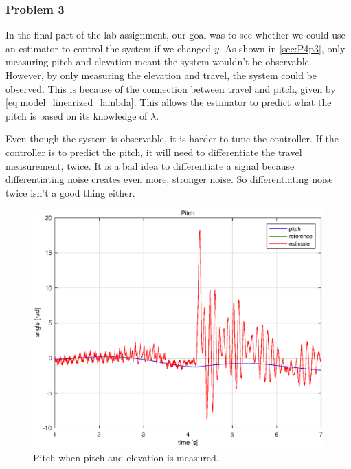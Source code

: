 

\subsubsection{Problem 3}


In the final part of the lab assignment, our goal was to see whether we could use an estimator to control the system if we changed $y$. As shown in \cref{sec:P4p3}, only measuring pitch and elevation meant the system wouldn't be observable. However, by only measuring the elevation and travel, the system could be observed. This is because of the connection between travel and pitch, given by \cref{eq:model_linearized_lambda}. This allows the estimator to predict what the pitch is based on its knowledge of $\lambda$. \medskip

Even though the system is observable, it is harder to tune the controller. If the controller is to predict the pitch, it will need to differentiate the travel measurement, twice. It is a bad idea to differentiate a signal because differentiating noise creates even more, stronger noise. So differentiating noise twice isn't a good thing either.\medskip

\begin{figure}[H]
    \centering
	\includegraphics[width=0.9\linewidth]{plots/part4new/pitch_bad.eps}
    \caption{Pitch when pitch and elevation is measured.}
    \label{fig:BAD}
\end{figure}

